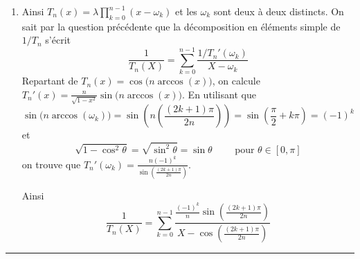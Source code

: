\documentclass[11pt,a4paper]{article}
\newcommand{\fincorrection}{\vspace{1mm}\hrule\vspace*{7mm}}
\begin{document}
\begin{enumerate}
\begin{enumerate}
  \item Ainsi $T_n(x)= \lambda \prod_{k=0}^{n-1}(x-\omega_k)$ et les $\omega_k$ sont deux à deux distincts.
  On sait par la question précédente que la décomposition en éléments simple de $1/T_n$ s'écrit 
$$\frac{1}{T_n(X)}=\sum_{k=0}^{n-1} \frac{1/T_n'(\omega_k)}{X-\omega_k}$$
Repartant de $T_n(x)=\cos\big(n \arccos(x)\big)$, on calcule 
$T_n'(x)=\frac{n}{\sqrt{1-x^2}}\sin\big(n\arccos(x)\big)$.
En utilisant que 
$$\sin\big(n \arccos(\omega_k)\big) = \sin \left( n\left(\frac{(2k+1)\pi}{2n}\right)\right) 
= \sin\left(\frac{\pi}{2}+k\pi \right) = (-1)^k$$
et 
$$\sqrt{1-\cos^2 \theta} = \sqrt{\sin^2 \theta} = \sin \theta \qquad \text{ pour } \theta \in [0,\pi]$$
on trouve que 
$T_n'(\omega_k)=\frac{n(-1)^k}{\sin\left(\frac{(2k+1)\pi}{2n}\right)}$.

Ainsi 
$$\frac{1}{T_n(X)}=\sum_{k=0}^{n-1}\frac{\frac{(-1)^k}{n}\sin\left(\frac{(2k+1)\pi}{2n}\right)}{X-\cos\left(\frac{(2k+1)\pi}{2n}\right)}$$
  \end{enumerate}
\end{enumerate}
\fincorrection
\end{document}
